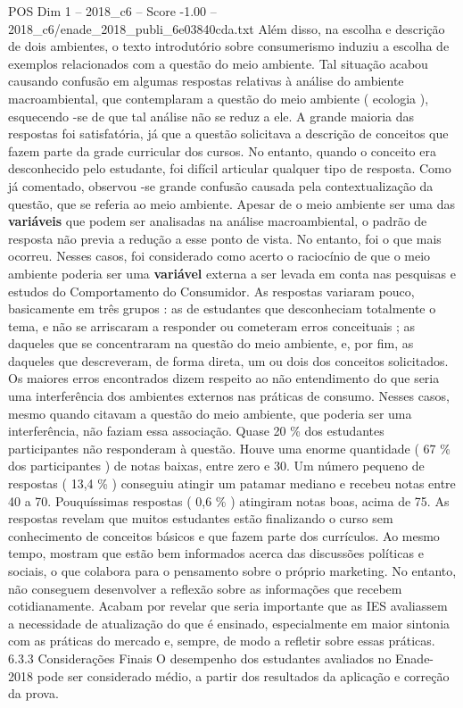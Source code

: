 \begin{textsample}{POS Dim 1 – 2018\_c6 – Score -1.00 – 2018\_c6/enade\_2018\_publi\_6e03840cda.txt}
Além disso, na escolha e descrição de dois ambientes, o texto introdutório sobre consumerismo induziu a escolha de exemplos relacionados com a questão do meio ambiente.
Tal situação acabou causando confusão em algumas respostas relativas à análise do ambiente macroambiental, que contemplaram a questão do meio ambiente ( ecologia ), esquecendo -se de que tal análise não se reduz a ele.
A grande maioria das respostas foi satisfatória, já que a questão solicitava a descrição de conceitos que fazem parte da grade curricular dos cursos.
No entanto, quando o conceito era desconhecido pelo estudante, foi difícil articular qualquer tipo de resposta.
Como já comentado, observou -se grande confusão causada pela contextualização da questão, que se referia ao meio ambiente.
Apesar de o meio ambiente ser uma das \textbf{variáveis} que podem ser analisadas na análise macroambiental, o padrão de resposta não previa a redução a esse ponto de vista.
No entanto, foi o que mais ocorreu.
Nesses casos, foi considerado como acerto o raciocínio de que o meio ambiente poderia ser uma \textbf{variável} externa a ser levada em conta nas pesquisas e estudos do Comportamento do Consumidor.
As respostas variaram pouco, basicamente em três grupos : as de estudantes que desconheciam totalmente o tema, e não se arriscaram a responder ou cometeram erros conceituais ; as daqueles que se concentraram na questão do meio ambiente, e, por fim, as daqueles que descreveram, de forma direta, um ou dois dos conceitos solicitados.
Os maiores erros encontrados dizem respeito ao não entendimento do que seria uma interferência dos ambientes externos nas práticas de consumo.
Nesses casos, mesmo quando citavam a questão do meio ambiente, que poderia ser uma interferência, não faziam essa associação.
Quase 20 \% dos estudantes participantes não responderam à questão.
Houve uma enorme quantidade ( 67 \% dos participantes ) de notas baixas, entre zero e 30.
Um número pequeno de respostas ( 13,4 \% ) conseguiu atingir um patamar mediano e recebeu notas entre 40 a 70.
Pouquíssimas respostas ( 0,6 \% ) atingiram notas boas, acima de 75.
As respostas revelam que muitos estudantes estão finalizando o curso sem conhecimento de conceitos básicos e que fazem parte dos currículos.
Ao mesmo tempo, mostram que estão bem informados acerca das discussões políticas e sociais, o que colabora para o pensamento sobre o próprio marketing.
No entanto, não conseguem desenvolver a reflexão sobre as informações que recebem cotidianamente.
Acabam por revelar que seria importante que as IES avaliassem a necessidade de atualização do que é ensinado, especialmente em maior sintonia com as práticas do mercado e, sempre, de modo a refletir sobre essas práticas. 6.3.3 Considerações Finais O desempenho dos estudantes avaliados no Enade-2018 pode ser considerado médio, a partir dos resultados da aplicação e correção da prova.

\end{textsample}
